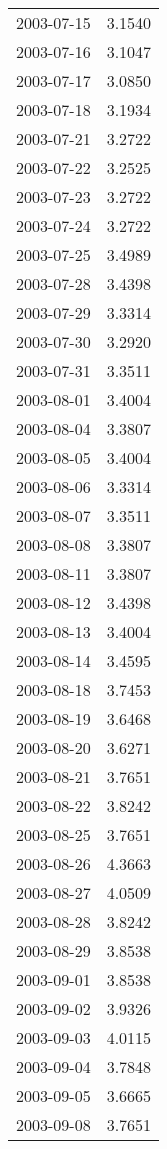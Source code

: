 \begin{tabular}{lr}
2003-07-15 &      3.1540 \\
2003-07-16 &      3.1047 \\
2003-07-17 &      3.0850 \\
2003-07-18 &      3.1934 \\
2003-07-21 &      3.2722 \\
2003-07-22 &      3.2525 \\
2003-07-23 &      3.2722 \\
2003-07-24 &      3.2722 \\
2003-07-25 &      3.4989 \\
2003-07-28 &      3.4398 \\
2003-07-29 &      3.3314 \\
2003-07-30 &      3.2920 \\
2003-07-31 &      3.3511 \\
2003-08-01 &      3.4004 \\
2003-08-04 &      3.3807 \\
2003-08-05 &      3.4004 \\
2003-08-06 &      3.3314 \\
2003-08-07 &      3.3511 \\
2003-08-08 &      3.3807 \\
2003-08-11 &      3.3807 \\
2003-08-12 &      3.4398 \\
2003-08-13 &      3.4004 \\
2003-08-14 &      3.4595 \\
2003-08-18 &      3.7453 \\
2003-08-19 &      3.6468 \\
2003-08-20 &      3.6271 \\
2003-08-21 &      3.7651 \\
2003-08-22 &      3.8242 \\
2003-08-25 &      3.7651 \\
2003-08-26 &      4.3663 \\
2003-08-27 &      4.0509 \\
2003-08-28 &      3.8242 \\
2003-08-29 &      3.8538 \\
2003-09-01 &      3.8538 \\
2003-09-02 &      3.9326 \\
2003-09-03 &      4.0115 \\
2003-09-04 &      3.7848 \\
2003-09-05 &      3.6665 \\
2003-09-08 &      3.7651 \\

\end{tabular}
